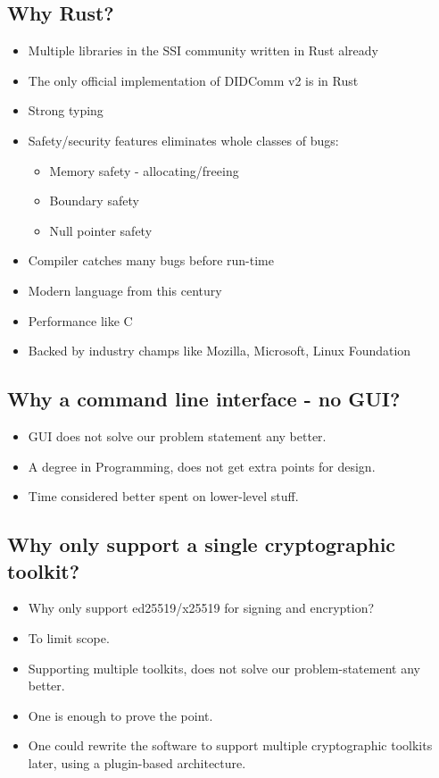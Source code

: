 \subsection{Why Rust?}
\begin{itemize}
\item Multiple libraries in the SSI community written in Rust already
\item The only official implementation of DIDComm v2 is in Rust
\item Strong typing
\item Safety/security features eliminates whole classes of bugs:
    \begin{itemize}
    \item Memory safety - allocating/freeing
    \item Boundary safety
    \item Null pointer safety
    \end{itemize}
\item Compiler catches many bugs before run-time
\item Modern language from this century
\item Performance like C
\item Backed by industry champs like Mozilla, Microsoft, Linux Foundation
\end{itemize}



\subsection{Why a command line interface - no GUI?}

\begin{itemize}
\item GUI does not solve our problem statement any better.
\item A degree in Programming, does not get extra points for design.
\item Time considered better spent on lower-level stuff.
\end{itemize}



\subsection{Why only support a single cryptographic toolkit?}
\begin{itemize}

    \item Why only support ed25519/x25519 for signing and encryption?
    \item To limit scope.
    \item Supporting multiple toolkits, does not solve our problem-statement any better.
    \item One is enough to prove the point.
    \item One could rewrite the software to support multiple cryptographic toolkits later, using a plugin-based architecture.
\end{itemize}



